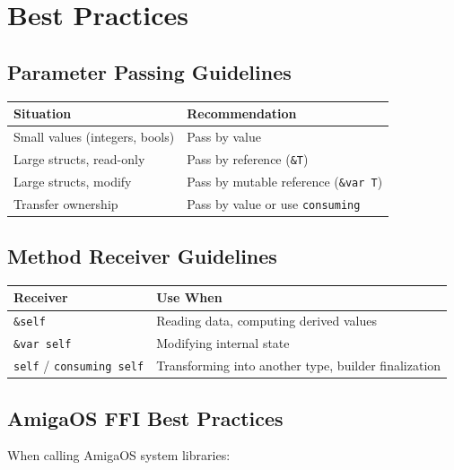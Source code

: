 \section{Best Practices}
\label{sec:fn-best-practices}

\subsection{Parameter Passing Guidelines}
\label{subsec:param-guidelines}

\begin{center}
\begin{tabular}{lp{8cm}}
\textbf{Situation} & \textbf{Recommendation} \\
\hline
Small values (integers, bools) & Pass by value \\
Large structs, read-only & Pass by reference (\texttt{\&T}) \\
Large structs, modify & Pass by mutable reference (\texttt{\&var T}) \\
Transfer ownership & Pass by value or use \texttt{consuming} \\
\end{tabular}
\end{center}

\subsection{Method Receiver Guidelines}
\label{subsec:receiver-guidelines}

\begin{center}
\begin{tabular}{lp{8cm}}
\textbf{Receiver} & \textbf{Use When} \\
\hline
\texttt{\&self} & Reading data, computing derived values \\
\texttt{\&var self} & Modifying internal state \\
\texttt{self} / \texttt{consuming self} & Transforming into another type, builder finalization \\
\end{tabular}
\end{center}

\subsection{AmigaOS FFI Best Practices}
\label{subsec:amiga-best-practices}

When calling AmigaOS system libraries:

